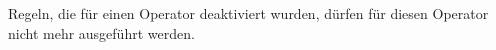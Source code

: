 Regeln, die für einen Operator deaktiviert wurden, dürfen für diesen Operator nicht mehr ausgeführt werden.












